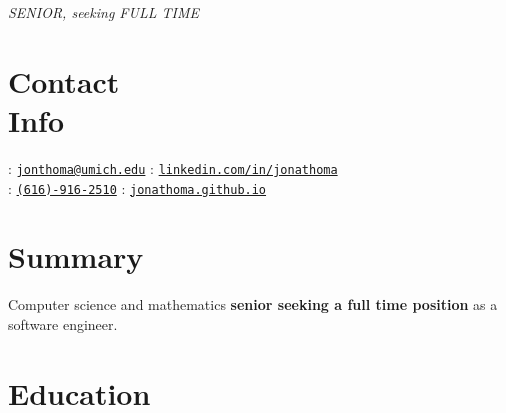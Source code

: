 \documentclass[margin,line]{resume}
\begin{document}
 {\hfill\textsl{\large SENIOR, seeking FULL TIME}}
      
\begin{resume}
	\vspace{-3.5mm}
	\section{\mysidestyle Contact\\Info}
	\noindent \faEnvelope : \href{mailto:jonthoma@umich.edu}{\nolinkurl{jonthoma@umich.edu}} \hfill \faLinkedinSign : \href{https://linkedin.com/in/jonathoma}{\nolinkurl{linkedin.com/in/jonathoma}}\\
	\noindent \faPhone : \href{tel:+1-616-916-2510}{\nolinkurl{(616)-916-2510}} \hfill \faUser : \href{https://jonathoma.github.io}{\nolinkurl{jonathoma.github.io}} \\ %
	\vspace{-2.5mm}
	    
	\sectionbreak
	\vspace{-3.5mm}
	\section{\mysidestyle Summary}
	Computer science and mathematics \textbf{senior seeking a full time position} as a software engineer. \vspace{-2.5mm}\\ 
	    
	\sectionbreak
	\vspace{-2.5mm}
	\section{\mysidestyle Education}
	

\end{resume}
\end{document}
